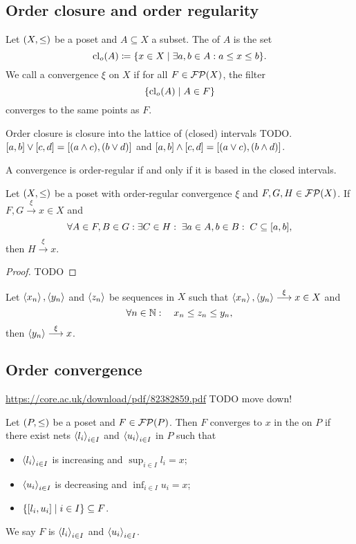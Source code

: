 \subsection{Order closure and order regularity}
\begin{definition}
Let $\left( X, \leq \right)$ be a poset and $A\subseteq X$ a subset. The  of $A$ is the set
\[ \closure_o(A) \defeq \setbuilder{x\in X}{\exists a,b\in A: a\leq x\leq b}. \]
We call a convergence $\xi$ on $X$  if for all $F\in \operatorname{\mathcal{FP}}(X)$, the filter
\[ \setbuilder{\closure_o(A)}{A\in F} \]
converges to the same points as $F$.
\end{definition}
Order closure is closure into the lattice of (closed) intervals TODO. $\interval{a,b}\vee \interval{c,d} = \interval{(a\wedge c), (b\vee d)}$ and $\interval{a,b}\wedge \interval{c,d} = \interval{(a\vee c), (b\wedge d)}$.


\begin{lemma}
A convergence is order-regular \textup{if and only if} it is based in the closed intervals.
\end{lemma}

\begin{proposition}
Let $\left( X,\leq \right)$ be a poset with order-regular convergence $\xi$ and $F,G,H\in \operatorname{\mathcal{FP}}(X)$. If $F,G\overset{\xi}{\longrightarrow} x\in X$ and
\[ \forall A\in F,B\in G: \exists C\in H: \;\exists a\in A, b\in B:\; C\subseteq \interval{a,b},  \]
then $H\overset{\xi}{\longrightarrow} x$.
\end{proposition}
\begin{proof}
TODO
\end{proof}
\begin{corollary}
Let $\left\langle x_n \right\rangle, \left\langle y_n \right\rangle$ and $\left\langle z_n \right\rangle$ be sequences in $X$ such that $\left\langle x_n \right\rangle, \left\langle y_n \right\rangle\overset{\xi}{\longrightarrow} x\in X$ and
\[ \forall n\in \mathbb{N}: \quad x_n \leq z_n \leq y_n, \]
then $\left\langle y_n \right\rangle \overset{\xi}{\longrightarrow} x$.
\end{corollary}

\subsection{Order convergence}
\url{https://core.ac.uk/download/pdf/82382859.pdf}
TODO move down!

\begin{definition}
Let $\left( P,\leq \right)$ be a poset and $F\in\operatorname{\mathcal{FP}}(P)$. Then $F$ converges to $x$ in the  on $P$ if there exist nets $\left\langle l_i \right\rangle_{i\in I}$ and $\left\langle u_i \right\rangle_{i\in I}$ in $P$ such that
\begin{itemize}
    \item $\left\langle l_i \right\rangle_{i\in I}$ is increasing and $\sup_{i\in I} l_i = x$;
    \item $\left\langle u_i \right\rangle_{i\in I}$ is decreasing and $\inf_{i\in I} u_i = x$;
    \item $\setbuilder{[l_i, u_i]}{i\in I} \subseteq F$.
\end{itemize}
We say $F$ is  $\left\langle l_i \right\rangle_{i\in I}$ and $\left\langle u_i \right\rangle_{i\in I}$.
\end{definition}

